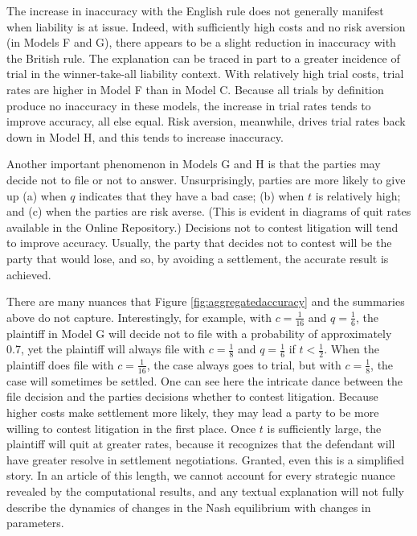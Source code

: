 \documentclass{article}
\begin{document}
The increase in inaccuracy with the English rule does not generally manifest when liability is at issue. Indeed, with sufficiently high costs and no risk aversion (in Models F and G), there appears to be a slight reduction in inaccuracy with the British rule. The explanation can be traced in part to a greater incidence of trial in the winner-take-all liability context. With relatively high trial costs, trial rates are higher in Model F than in Model C.  Because all trials by definition produce no inaccuracy in these models, the increase in trial rates tends to improve accuracy, all else equal. Risk aversion, meanwhile, drives trial rates back down in Model H, and this tends to increase inaccuracy. 

Another important phenomenon in Models G and H is that the parties may decide not to file or not to answer. Unsurprisingly, parties are more likely to give up (a) when $q$ indicates that they have a bad case; (b) when $t$ is relatively high; and (c) when the parties are risk averse. (This is evident in diagrams of quit rates available in the Online Repository.) Decisions not to contest litigation will tend to improve accuracy. Usually, the party that decides not to contest will be the party that would lose, and so, by avoiding a settlement, the accurate result is achieved.

There are many nuances that Figure \ref{fig:aggregatedaccuracy} and the summaries above do not capture. Interestingly, for example, with $c = \frac{1}{16}$ and $q = \frac{1}{6}$, the plaintiff in Model G will decide not to file with a probability of approximately 0.7, yet the plaintiff will always file with $c = \frac{1}{8}$ and $q = \frac{1}{6}$ if $t < \frac{1}{2}$. When the plaintiff does file with $c = \frac{1}{16}$, the case always goes to trial, but with $c = \frac{1}{8}$, the case will sometimes be settled. One can see here the intricate dance between the file decision and the parties decisions whether to contest litigation. Because higher costs make settlement more likely, they may lead a party to be more willing to contest litigation in the first place. Once $t$ is sufficiently large, the plaintiff will quit at greater rates, because it recognizes that the defendant will have greater resolve in settlement negotiations. Granted, even this is a simplified story. In an article of this length, we cannot account for every strategic nuance revealed by the computational results, and any textual explanation will not fully describe the dynamics of changes in the Nash equilibrium with changes in parameters.
\end{document}
